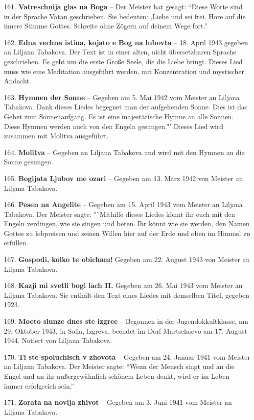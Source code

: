 \documentclass[11pt,a5paper,twoside]{article}
\begin{document}
161. \textbf{Vatreschnija glas na Boga} -- Der Meister hat gesagt: "`Diese Worte sind in der Sprache Vatan geschrieben. Sie bedeuten: ‚Liebe und sei frei. Höre auf die innere Stimme Gottes. Schreite ohne
Zögern auf deinem Wege fort."'

162. \textbf{Edna vechna istina, kojato e Bog na lubovta} -- 18. April 1943 gegeben an Liljana Tabakova. Der Text ist in einer alten, nicht übersetzbaren Sprache geschrieben. Es geht um die erste Große Seele, die die Liebe bringt. Dieses Lied muss wie eine Meditation ausgeführt werden, mit Konzentration und mystischer Andacht. 

163. \textbf{Hymnen der Sonne} -- Gegeben am 5. Mai 1942 vom Meister an Liljana Tabakova. Dank dieses Liedes begegnet man der aufgehenden Sonne. Dies ist das Gebet zum Sonnenaufgang. Es ist eine majestätische Hymne an alle Sonnen. Diese Hymnen werden auch von den Engeln gesungen."' Dieses Lied wird zusammen mit Molitva ausgeführt.

164. \textbf{Molitva} -- Gegeben an Liljana Tabakova und wird mit den Hymnen an die Sonne gesungen.

165. \textbf{Bogijata Ljubov me ozari} -- Gegeben am 13. März 1942 von Meister an Liljana Tabakova.

166. \textbf{Pesen na Angelite} -- Gegeben am 15. April 1943 vom Meister an Liljana Tabakova. Der Meister sagte: "`Mithilfe dieses Liedes könnt ihr euch mit den Engeln verdingen, wie sie singen und beten. Ihr könnt wie sie werden, den Namen Gottes zu lobpreisen und seinen Willen hier auf der Erde und oben im Himmel zu erfüllen.

167. \textbf{Gospodi, kolko te obicham!} Gegeben am 22. August 1943 von Meister an Liljana Tabakova. 

168. \textbf{Kazji mi svetli bogi lach II.} Gegeben am 26. Mai 1943 vom Meister an Liljana Tabakova. Sie enthält den Text eines Liedes mit demselben Titel, gegeben 1923.

169. \textbf{Moeto slunze dnes ste izgree} -- Begonnen in der Jugendokkultklasse, am 29. Oktober 1943, in Sofia, Izgreva, beendet im Dorf Martschaevo am 17. August 1944. Notiert von Liljana Tabakova.

170. \textbf{Ti ste spoluchisch v zhovota} -- Gegeben am 24. Januar 1941 vom Meister an Liljana Tabakova. Der Meister sagte: "`Wenn der Mensch singt und an die Engel und an ihr außergewähnlich schönem Leben denkt, wird er im Leben immer erfolgreich sein."'

171. \textbf{Zorata na novija zhivot} -- Gegeben am 3. Juni 1941 vom Meister an Liljana Tabakova.
\end{document}
